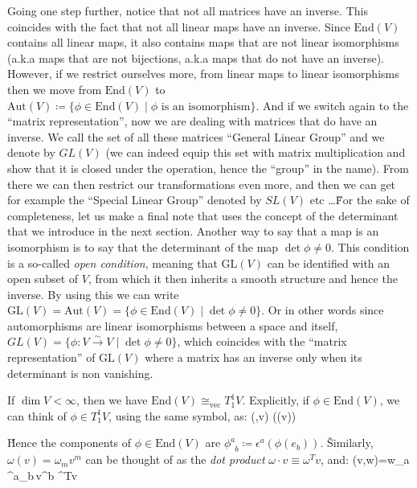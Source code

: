Going one step further, notice that not all matrices have an inverse. This coincides with the fact that not all
linear maps have an inverse. Since $\mathrm{End}(V)$ contains all linear maps, it also contains maps that are not
linear isomorphisms (a.k.a maps that are not bijections, a.k.a maps that do not have an inverse). However, if we
restrict ourselves more, from linear maps to linear isomorphisms then we move from $\mathrm{End}(V)$ to $
\mathrm{Aut}(V) \coloneqq \{\phi \in \mathrm{End}(V) \mid \phi \text{ is an isomorphism}\}$. And if we switch again
to the ``matrix representation'', now we are dealing with matrices that do have an inverse. We call the set of all
these matrices ``General Linear Group'' and we denote by $GL(V)$ (we can indeed equip this set with matrix
multiplication and show that it is closed under the operation, hence the ``group'' in the name). From there we can
then restrict our transformations even more, and then we can get for example the ``Special Linear Group'' denoted by
$SL(V)$ etc \ldots \v

For the sake of completeness, let us make a final note that uses the concept of the determinant that we introduce in
the next section. Another way to say that a map is an isomorphism is to say that the determinant of the map $\det
\phi\neq 0$. This condition is a so-called \emph{open condition}, meaning that $\mathrm{GL}(V)$ can be identified
with an open subset of $V$, from which it then inherits a smooth structure and hence the inverse. By using this we
can write $\mathrm{GL}(V)= \mathrm{Aut}(V) = \{\phi \in \mathrm{End}(V) \mid \det \phi \neq 0 \}$. Or in other words
since automorphisms are linear isomorphisms between a space and itself, $ GL(V) = \{\phi: V \xrightarrow{\sim} V \mid
\det \phi \neq 0\}$, which coincides with the ``matrix representation'' of $\mathrm{GL}(V)$ where a matrix has an
inverse only when its determinant is non vanishing.

\be
If $\dim V<\infty$, then we have $\mathrm{End}(V)\cong_\mathrm{vec}T^1_1 V$. Explicitly, if $\phi \in \mathrm{End}(V)
$, we can think of $\phi \in T^1_1 V$, using the same symbol, as:
\bse
\phi(\omega,v) \coloneqq \omega(\phi(v))
\ese

\v

Hence the components of $\phi\in\mathrm{End}(V)$ are $\phi^a_{\phantom{a}b} \coloneqq \epsilon^a(\phi(e_b))$. \v

Similarly, $\omega(v)=\omega_m v^m$ can be thought of as the \emph{dot product} $\omega \cdot v\equiv\omega^T v$, and:
\bse
\phi(v,w)=w_a\,\phi^a_{\phantom{a}b}\,v^b \quad \leftrightsquigarrow \quad \omega^T\phi v
\ese

